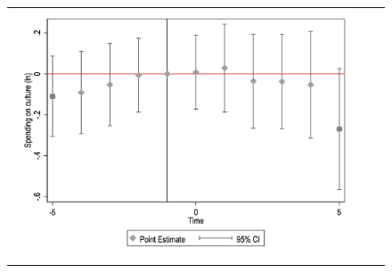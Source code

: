 \begin{figure}[ht]
\begin{tabular}{@{}ccc@{}}
\begin{minipage}[t]{0.32\textwidth}
            \includegraphics[width=\linewidth]{images/pop_5000/eventdd_ln_q4_05_step1.jpg}
            \label{fig:culture}
        \end{minipage} \\[10pt]


\end{tabular}
\end{figure}
